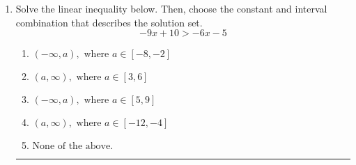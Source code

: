 \documentclass[14pt]{extbook}
\newcommand{\litem}[1]{\item#1\hspace*{-1cm}\rule{\textwidth}{0.4pt}}
\begin{document}
\begin{enumerate}
{\begin{enumerate}[label=\Alph*.]
\end{enumerate} }
\litem{
Solve the linear inequality below. Then, choose the constant and interval combination that describes the solution set.\[ -9x + 10 > -6x -5 \]\begin{enumerate}[label=\Alph*.]
\item \( (-\infty, a), \text{ where } a \in [-8, -2] \)
\item \( (a, \infty), \text{ where } a \in [3, 6] \)
\item \( (-\infty, a), \text{ where } a \in [5, 9] \)
\item \( (a, \infty), \text{ where } a \in [-12, -4] \)
\item \( \text{None of the above}. \)

\end{enumerate} }
\end{enumerate}
\end{document}
